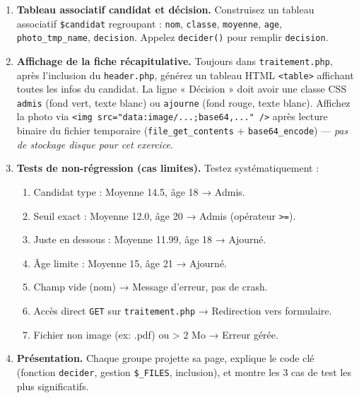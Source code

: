 \documentclass[11pt]{article}
\begin{document}
\begin{enumerate}
\begin{enumerate}
        \item Pour chaque champ texte/nombre, utilisez \texttt{isset(\$\_POST['champ'])} et \texttt{trim()} pour récupérer la valeur dans une variable locale. Pour le fichier, vérifiez \texttt{isset(\$\_FILES['photo\_identite']) \&\& \$\_FILES['photo\_identite']['error'] === UPLOAD\_ERR\_OK}.
        \item Validez la moyenne : \texttt{is\_numeric()} et intervalle [0, 20]. Validez la date : \texttt{strtotime()} ne retourne pas \texttt{false}.
        \item En cas d'erreur de validation, affichez un message d'erreur clair dans la page (incluant \texttt{header/footer}) et arrêtez le script (\texttt{exit}).
    \end{enumerate}
    \item \textbf{Tableau associatif candidat et décision.} Construisez un tableau associatif \texttt{\$candidat} regroupant : \texttt{nom}, \texttt{classe}, \texttt{moyenne}, \texttt{age}, \texttt{photo\_tmp\_name}, \texttt{decision}. Appelez \texttt{decider()} pour remplir \texttt{decision}.
    \item \textbf{Affichage de la fiche récapitulative.} Toujours dans \texttt{traitement.php}, après l'inclusion du \texttt{header.php}, générez un tableau HTML \texttt{<table>} affichant toutes les infos du candidat. La ligne « Décision » doit avoir une classe CSS \texttt{admis} (fond vert, texte blanc) ou \texttt{ajourne} (fond rouge, texte blanc). Affichez la photo via \texttt{<img src="data:image/...;base64,..." />} après lecture binaire du fichier temporaire (\texttt{file\_get\_contents} + \texttt{base64\_encode}) — \emph{pas de stockage disque pour cet exercice}.
    \item \textbf{Tests de non-régression (cas limites).} Testez systématiquement :
    \begin{enumerate}
        \item Candidat type : Moyenne 14.5, âge 18 → Admis.
        \item Seuil exact : Moyenne 12.0, âge 20 → Admis (opérateur \texttt{>=}).
        \item Juste en dessous : Moyenne 11.99, âge 18 → Ajourné.
        \item Âge limite : Moyenne 15, âge 21 → Ajourné.
        \item Champ vide (nom) → Message d'erreur, pas de crash.
        \item Accès direct \texttt{GET} sur \texttt{traitement.php} → Redirection vers formulaire.
        \item Fichier non image (ex: .pdf) ou > 2 Mo → Erreur gérée.
    \end{enumerate}
    \item \textbf{Présentation.} Chaque groupe projette sa page, explique le code clé (fonction \texttt{decider}, gestion \texttt{\$\_FILES}, inclusion), et montre les 3 cas de test les plus significatifs.
\end{enumerate}
\end{document}
